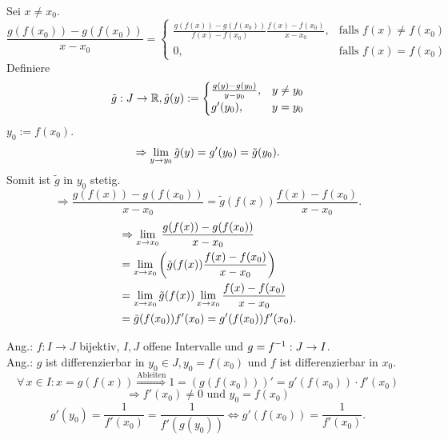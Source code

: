 \documentclass[../ana1.tex]{subfiles}
\begin{document}
\begin{bew}
    Sei \( x \neq x_0 \).
    \[ \frac{ g(f(x_0)) - g(f(x_0)) }{ x - x_0 } = \begin{cases}
        \frac{ g(f(x)) - g(f(x_0)) }{f(x) - f(x_0)} 
        \frac{ f(x) - f(x_0) }{ x-x_0 }, &\text{falls } f(x) \neq f(x_0)\\
        0, &\text{falls } f(x) = f(x_0)
    \end{cases} \]
    Definiere \[ \tilde{g} : J \rightarrow \mathbb{R}, \tilde{g}(y) := \begin{cases}
        \frac{ g(y) - g(y_0) }{ y - y_0 }, &y \neq y_0\\
        g'(y_0), &y=y_0
    \end{cases} \]
    \( y_0 := f(x_0) \).
    \[ \Rightarrow \lim\limits_{y\rightarrow y_0} \tilde{g}(y) = g'(y_0) = \tilde{g}(y_0). \]
    Somit ist \( \tilde{g} \) in \(y_0\) stetig.
    \[ \Rightarrow \frac{ g(f(x)) - g(f(x_0)) }{ x - x_0 } 
    = \tilde{g}(f(x)) \frac{ f(x) - f(x_0) }{x - x_0}. \]
    \begin{align*}
        &\Rightarrow \lim\limits_{x\rightarrow x_0} \frac{ g(f(x)) - g(f(x_0)) }{ x - x_0 } \\
        &= \lim\limits_{x\rightarrow x_0} \left( \tilde{g}(f(x)) \frac{f(x) - f(x_0)}{x - x_0} \right) \\
        &= \lim\limits_{x\rightarrow x_0} \tilde{g}(f(x)) \lim\limits_{x\rightarrow x_0} \frac{f(x) - f(x_0)}{x - x_0} \\
        &= \tilde{g}(f(x_0))f'(x_0) = g'(f(x_0)) f'(x_0).
    \end{align*}
\end{bew}
Ang.: \( f : I \rightarrow J\) bijektiv, \( I, J \) offene Intervalle und 
\( g = \inverse{f} : J \rightarrow I \).\\
Ang.: \( g \) ist differenzierbar in \( y_0 \in J, y_0 = f(x_0) \) und 
\( f \) ist differenzierbar in \(x_0\).
\[\forall \, x\in I: x = g(f(x)) \overset{\text{Ableiten}}{\Rightarrow} 1 = (g(f(x_0)))' 
= g'(f(x_0)) \cdot f'(x_0) \]
\[ \Rightarrow f'(x_0) \neq 0 \text{ und } y_0 = f(x_0) \]
\[ g'(y_0) = \frac{1}{f'(x_0)} = \frac{1}{f'(g(y_0))} 
\Leftrightarrow g'(f(x_0)) = \frac{1}{f'(x_0)}. \] %
\end{document}
